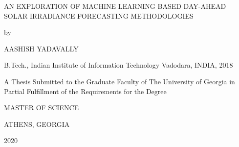 \thispagestyle{empty}
\begin{center}
    AN EXPLORATION OF MACHINE LEARNING BASED DAY-AHEAD SOLAR IRRADIANCE FORECASTING METHODOLOGIES
    
    \vspace*{2\baselineskip}
    by

    \vspace*{2\baselineskip}
    AASHISH YADAVALLY
    
    B.Tech., Indian Institute of Information Technology Vadodara, INDIA, 2018
    \vspace*{4\baselineskip}

    A Thesis Submitted to the Graduate Faculty of The University of Georgia
    in Partial Fulfillment of the Requirements for the Degree
    \vspace*{3\baselineskip}

    MASTER OF SCIENCE
    \vspace*{3\baselineskip}

    ATHENS, GEORGIA
    
    2020
\end{center}

\newpage
